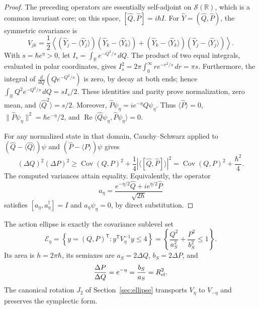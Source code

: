\begin{proof}
The preceding operators are essentially self-adjoint on
\(\mathcal S(\mathbb R)\), which is a common invariant core;
on this space,
\([\widehat Q,\widehat P]=i\hbar I\). For
\(\widehat Y=(\widehat Q,\widehat P)\), the symmetric covariance is
\[
 V_{jk}=\frac12\left\langle
 (\widehat Y_j-\langle\widehat Y_j\rangle)
 (\widehat Y_k-\langle\widehat Y_k\rangle)
 +(\widehat Y_k-\langle\widehat Y_k\rangle)
 (\widehat Y_j-\langle\widehat Y_j\rangle)
 \right\rangle.
\]
With \(s=\hbar e^\eta>0\), let
\(I_s=\int_{\mathbb R}e^{-Q^2/s}\,dQ\). The product of two
equal integrals, evaluated in polar coordinates, gives
\(I_s^2=2\pi\int_0^\infty r e^{-r^2/s}\,dr=\pi s\).
Furthermore, the integral of
\(\frac{d}{dQ}(Qe^{-Q^2/s})\) is zero, by decay at both
ends; hence
\(\int_{\mathbb R}Q^2e^{-Q^2/s}\,dQ=sI_s/2\).
These identities and parity prove normalization, zero mean, and
\(\langle\widehat Q^2\rangle=s/2\). Moreover,
\(\widehat P\psi_\eta=i e^{-\eta}Q\psi_\eta\).
Thus \(\langle\widehat P\rangle=0\),
\(\|\widehat P\psi_\eta\|^2=\hbar e^{-\eta}/2\), and
\(\operatorname{Re}\langle\widehat Q\psi_\eta,
\widehat P\psi_\eta\rangle=0\).

For any normalized state in that domain, Cauchy--Schwarz applied
to \((\widehat Q-\langle\widehat Q\rangle)\psi\) and
\((\widehat P-\langle\widehat P\rangle)\psi\) gives
\[
 (\Delta Q)^2(\Delta P)^2
 \geq \operatorname{Cov}(Q,P)^2
       +\frac14\left|\langle[\widehat Q,\widehat P]\rangle\right|^2
 =\operatorname{Cov}(Q,P)^2+\frac{\hbar^2}{4}.
\]
The computed variances attain equality. Equivalently, the
operator
\[
 a_\eta=\frac{e^{-\eta/2}\widehat Q
                  +i e^{\eta/2}\widehat P}{\sqrt{2\hbar}}
\]
satisfies \([a_\eta,a_\eta^\dagger]=I\) and
\(a_\eta\psi_\eta=0\), by direct substitution.
\end{proof}

\begin{proposition}
\label{prop:ii-area-covarianza-reciprocidad}
The action ellipse is exactly the covariance sublevel set
\begin{equation}
 \mathcal E_\eta
 =\left\{y=(Q,P)^{\mathsf T}:y^{\mathsf T}V_\eta^{-1}y\leq4\right\}
 =\left\{\frac{Q^2}{a_S^2}+\frac{P^2}{b_S^2}\leq1\right\}.
 \label{eq:ii-elipse-covarianza}
\end{equation}
Its area is \(h=2\pi\hbar\), its semiaxes are
\(a_S=2\Delta Q\), \(b_S=2\Delta P\), and
\begin{equation}
 \frac{\Delta P}{\Delta Q}=e^{-\eta}
 =\frac{b_S}{a_S}=R_{\rm el}^2.
 \label{eq:ii-covarianza-forma}
\end{equation}
The canonical rotation \(J_2\) of Section~\ref{sec:ellipse} transports
\(V_\eta\) to \(V_{-\eta}\) and preserves the symplectic form.
\end{proposition}

